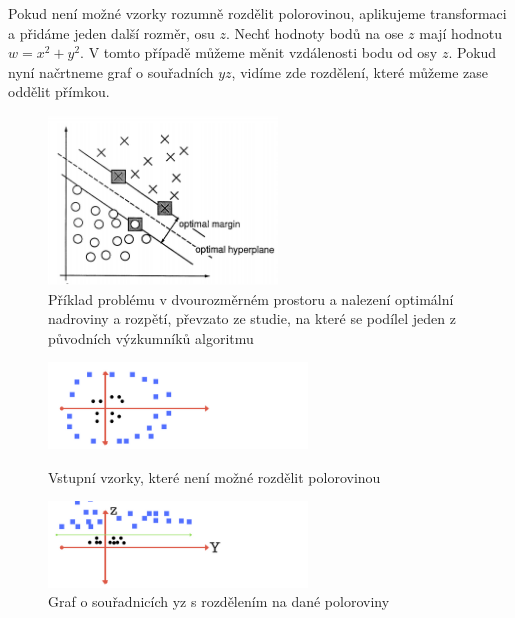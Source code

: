 Pokud není možné vzorky rozumně rozdělit polorovinou, aplikujeme transformaci a přidáme jeden další rozměr, osu $z$. Nechť hodnoty bodů na ose $z$ mají hodnotu $w = x^2 + y^2$. V tomto případě můžeme měnit vzdálenosti bodu od osy $z$. Pokud nyní načrtneme graf o souřadních $yz$, vidíme zde rozdělení, které můžeme zase oddělit přímkou. 

\begin{figure}[!htbp]
    \centering
    \includegraphics[width=230px]{obrazky-figures/svmVapnik.png}
    \caption{Příklad problému v dvourozměrném prostoru a nalezení optimální nadroviny a rozpětí, převzato ze studie, na které se podílel jeden z původních výzkumníků algoritmu \cite{VapnikSVM}}
\end{figure}

\begin{figure}[!htbp]
  \begin{minipage}[b]{0.5\linewidth}
  \centering
   \includegraphics[width=260px]{obrazky-figures/mediumsvm1.png}
   \caption{Vstupní vzorky, které není možné rozdělit polorovinou \cite{MediumSVM}}
  \end{minipage}
   \hspace{0.5cm}
  \begin{minipage}[b]{0.5\linewidth}
  \centering
   \includegraphics[width=260px]{obrazky-figures/mediumsvm2.png}
  \caption{Graf o souřadnicích yz s rozdělením na dané poloroviny \cite{MediumSVM}} 
  \end{minipage}
 \end{figure}


